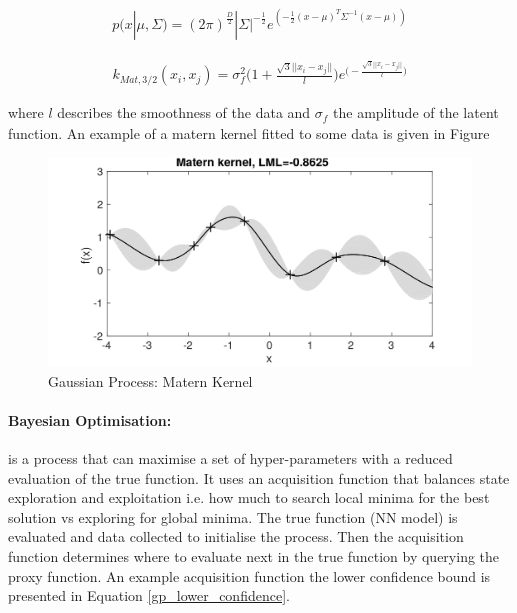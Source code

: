 \documentclass[11pt,twoside]{report}
\begin{document}
\begin{equation}
\begin{aligned}
p(x|\mu,\Sigma) = (2 \pi)^{\frac{D}{2}} | \Sigma|^{- \frac{1}{2}} e^{(- \frac{1}{2}(x- \mu)^{T} \Sigma^{-1}(x- \mu))}
\end{aligned}
\label{gaus_dist}
\end{equation}


\begin{equation}
\begin{aligned}
k_{Mat,3/2}(x_{i},x_{j}) = 
\sigma_{f}^{2} \bigg ( 1 + 
\frac{\sqrt{3}||x_{i}-x_{j}||}{\mathit{l}} \bigg )e^{ \big (-\frac{\sqrt{3}||x_{i}-x_{j}||}{\mathit{l}} \big )}
\end{aligned}
\label{matern}
\end{equation}

where $\mathit{l}$ describes the smoothness of the data and $\mathit{\sigma_{f}}$ the amplitude of the latent function. An example of a matern kernel fitted to some data is given in Figure 


\noindent \begin{figure}[h!]
	\includegraphics[width = 1.0\hsize]{./figures/Matern_Kernel.png}
	\caption{Gaussian Process: Matern Kernel \cite{Marc_Deisenroth_Notes}}
	\label{matern_kernel_fig}
\end{figure}

\paragraph{Bayesian Optimisation:}
is a process that can maximise a set of hyper-parameters with a reduced evaluation of the true function. It uses an acquisition function that balances state exploration and exploitation i.e. how much to search local minima for the best solution vs exploring for global minima. The true function (NN model) is evaluated and data collected to initialise the process. Then the acquisition function determines where to evaluate next in the true function by querying the proxy function. An example acquisition function the lower confidence bound \cite{SrinivasNiranjan2010GPOi} is presented in Equation \ref{gp_lower_confidence}.
\end{document}
